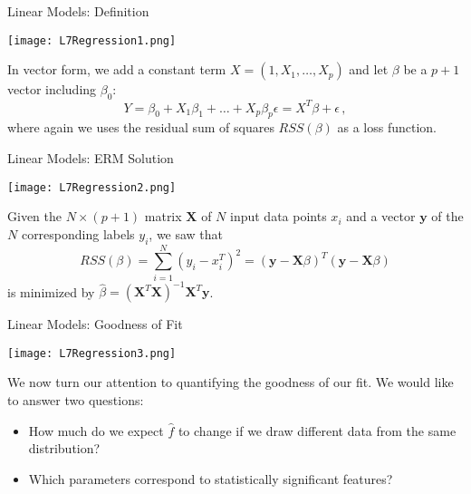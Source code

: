 \documentclass[10pt, table, dvipsnames,xcdraw, handout ]{beamer}
\newcommand{\bfX}{\ensuremath{\mathbf{X}}}
\newcommand{\bfy}{\ensuremath{\mathbf{y}}}
\begin{document}
\begin{frame}[fragile]{Linear Models: Definition}
  \begin{minipage}[t][0.5\textheight][t]{\textwidth}
	\centering \texttt{[image: L7Regression1.png]} 
  \end{minipage}
  \vfill
\begin{minipage}[t][0.5\textheight][t]{\textwidth}
In vector form, we add a constant term $X = (1,X_1,\ldots, X_p)$ and let $\beta$ be a $p+1$ vector including $\beta_0$:
$$
Y = \beta_0 + X_1\beta_1 +\ldots + X_p\beta_p \epsilon = X^T\beta + \epsilon\,,
$$ 
where again we uses the residual sum of squares $RSS(\beta)$ as a loss function.
\end{minipage}
\end{frame}



\begin{frame}[fragile]{Linear Models: ERM Solution}
  \begin{minipage}[t][0.5\textheight][t]{\textwidth}
	\centering \texttt{[image: L7Regression2.png]} 
  \end{minipage}
  \vfill
\begin{minipage}[t][0.5\textheight][t]{\textwidth}
Given the $N\times (p+1)$ matrix $\bfX$ of $N$ input data points $x_i$ and a vector $\bfy$ of the $N$ corresponding labels $y_i$, we saw that 
$$
RSS(\beta) = \sum_{i=1}^N(y_i - x_i^T)^2 = (\bfy - \bfX\beta)^T(\bfy - \bfX\beta)
$$
is minimized by $\hat{\beta} = (\bfX^T\bfX)^{-1}\bfX^T\bfy$.
\end{minipage}
\end{frame}




\begin{frame}[fragile]{Linear Models: Goodness of Fit}
  \begin{minipage}[t][0.5\textheight][t]{\textwidth}
	\centering \texttt{[image: L7Regression3.png]} 
  \end{minipage}
  \vfill
\begin{minipage}[t][0.5\textheight][t]{\textwidth}
We now turn our attention to quantifying the goodness of our fit. We would like to answer two questions:
\begin{itemize}
\item How much do we expect $\hat{f}$ to change if we draw different data from the same distribution?
\item Which parameters correspond to statistically significant features?
\end{itemize}
\end{minipage}
\end{frame}
\end{document}
